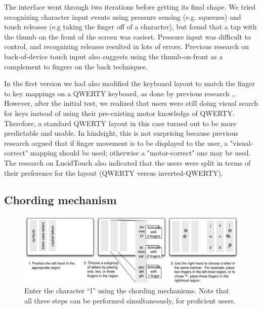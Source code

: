 The interface went through two iterations before getting its final
shape.  We tried recognizing character input events using pressure
sensing (e.g. squeezes) and touch releases (e.g taking the finger off
of a character), but found that a tap with the thumb on the front of
the screen was easiest.  Pressure input was difficult to control, and
recognizing releases resulted in lots of errors.  Previous research on
back-of-device touch input also suggests using the thumb-on-front as a
complement to fingers on the back techniques. \cite{Wobbrock}

In the first version we had also modified the keyboard layout to match
the finger to key mappings on a QWERTY keyboard, as done by previous
research \cite{RearType},\cite{LucidTouch}. However, after the initial
test, we realized that users were still doing visual search for keys
instead of using their pre-existing motor knowledge of
QWERTY. Therefore, a standard QWERTY layout in this case turned out to
be more predictable and usable. In hindsight, this is not surprising
because previous research \cite{Wobbrock} argued that if finger
movement is to be displayed to the user, a "visual-correct" mapping
should be used; otherwise a "motor-correct" one may be used. The
research on LucidTouch also indicated that the users were split in
terms of their preference for the layout (QWERTY versus
inverted-QWERTY). 

\subsection{Chording mechanism}
\begin{figure}
    \includegraphics[width=\textwidth]{Figures/chording_explaination.pdf} 
    \caption{Enter the character ``l'' using the chording mechanisms.
      Note that all three steps can be performed simultaneously, for
      proficient users.}
    \label{fig:chording_explanation}
\end{figure} 

